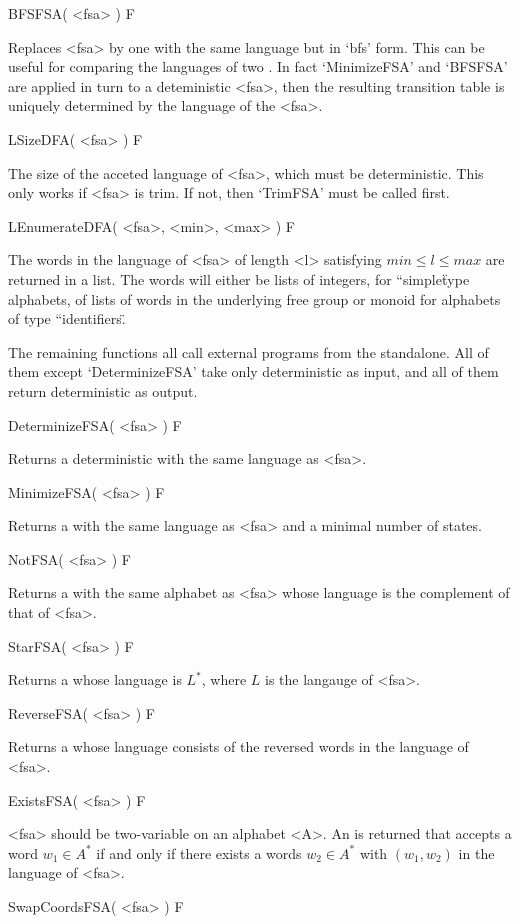 \>BFSFSA( <fsa> ) F

Replaces <fsa> by one with the same language but in `bfs' form.
This can be useful for comparing the languages of two {\fsa}.
In fact `MinimizeFSA' and `BFSFSA' are applied in turn to a
deteministic <fsa>, then the resulting transition table is
uniquely determined by the language of the <fsa>.

\>LSizeDFA( <fsa> ) F

The size of the acceted language of <fsa>, which must be deterministic.
This only works if <fsa> is trim. If not, then `TrimFSA' must be called
first.

\>LEnumerateDFA( <fsa>, <min>, <max> ) F

The words in the language of <fsa> of length <l> satisfying
$min \le l \le max$ are returned in a list. The words will either
be lists of integers, for ``simple\" type alphabets, of lists of
words in the underlying free group or monoid for alphabets of type
``identifiers\".

The remaining {\fsa} functions all call external programs from the
standalone. All of them except `DeterminizeFSA' take only
deterministic {\fsa} as input, and all of them return deterministic {\fsa}
as output.

\>DeterminizeFSA( <fsa> ) F

Returns a deterministic {\fsa} with the same language as <fsa>.

\>MinimizeFSA( <fsa> ) F

Returns a {\fsa} with the same language as <fsa> and a minimal
number of states.

\>NotFSA( <fsa> ) F

Returns a {\fsa} with the same alphabet as <fsa> whose language is the
complement of that of <fsa>.

\>StarFSA( <fsa> ) F

Returns a {\fsa} whose language is $L^{*}$, where $L$ is the langauge of <fsa>.

\>ReverseFSA( <fsa> ) F

Returns a {\fsa} whose language consists of the reversed words in the language
of <fsa>.

\>ExistsFSA( <fsa> ) F

<fsa> should be two-variable {\fsa} on an alphabet <A>. An {\fsa} is
returned that accepts a word $w_1 \in A^{*}$ if and only if there exists a
words $w_2 \in A^{*}$ with $(w_1,w_2)$ in the language of <fsa>.

\>SwapCoordsFSA( <fsa> ) F


